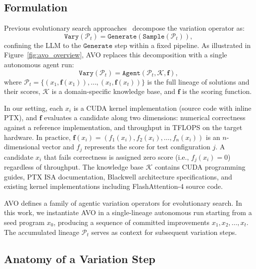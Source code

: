 \documentclass{article}
\begin{document}
\subsection{Formulation}
\label{sec:method_formal}

Previous evolutionary search approaches~\citep{funsearch2024, alphaevolve2025} decompose the variation operator as:
\begin{equation}
\label{eq:evo}
\texttt{Vary}(\mathcal{P}_t) = \texttt{Generate}(\texttt{Sample}(\mathcal{P}_t)),
\end{equation}
confining the LLM to the $\texttt{Generate}$ step within a fixed pipeline.
As illustrated in Figure~\ref{fig:avo_overview}, AVO replaces this decomposition with a single autonomous agent run:
\begin{equation}
\label{eq:avo}
\texttt{Vary}(\mathcal{P}_t) = \texttt{Agent}(\mathcal{P}_t, \mathcal{K}, \mathbf{f}),
\end{equation}
where $\mathcal{P}_t = \{(x_1, \mathbf{f}(x_1)), \ldots, (x_t, \mathbf{f}(x_t))\}$ is the full lineage of solutions and their scores, $\mathcal{K}$ is a domain-specific knowledge base, and $\mathbf{f}$ is the scoring function.

In our setting, each $x_i$ is a CUDA kernel implementation (source code with inline PTX), and $\mathbf{f}$ evaluates a candidate along two dimensions: numerical correctness against a reference implementation, and throughput in TFLOPS on the target hardware. In practice, $\mathbf{f}(x_i) = (f_1(x_i), f_2(x_i), \ldots, f_n(x_i))$ is an $n$-dimensional vector and $f_j$ represents the score for test configuration $j$.
A candidate $x_i$ that fails correctness is assigned zero score (i.e., $f_j(x_i) = 0$) regardless of throughput.
The knowledge base $\mathcal{K}$ contains CUDA programming guides, PTX ISA documentation, Blackwell architecture specifications, and existing kernel implementations including FlashAttention-4 source code.

AVO defines a family of agentic variation operators for evolutionary search. In this work, we instantiate AVO in a single-lineage autonomous run starting from a seed program $x_0$, producing a sequence of committed improvements $x_1, x_2, \ldots, x_t$. The accumulated lineage $\mathcal{P}_t$ serves as context for subsequent variation steps.

\subsection{Anatomy of a Variation Step}
\label{sec:method_step}
\end{document}
